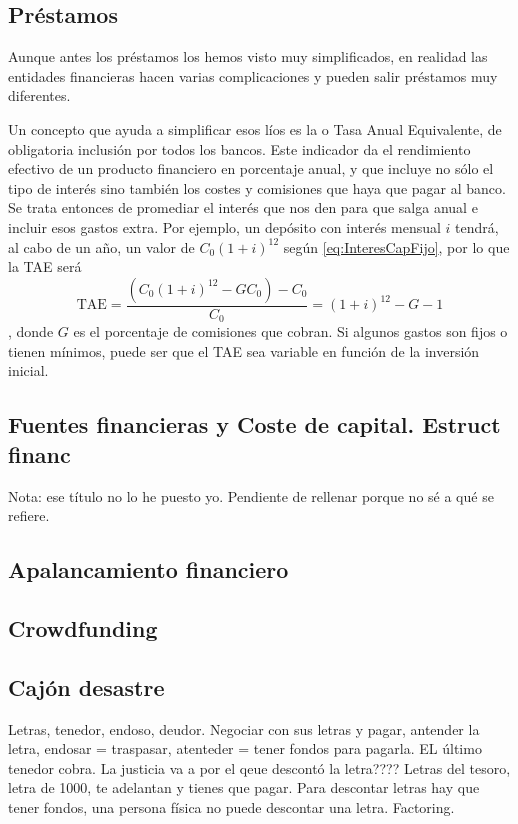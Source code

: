 \documentclass[nochap,palatino,shortheader]{apuntes}
\begin{document}
\subsection{Préstamos}

Aunque antes los préstamos los hemos visto muy simplificados, en realidad las entidades financieras hacen varias complicaciones y pueden salir préstamos muy diferentes.

Un concepto que ayuda a simplificar esos líos es la  o Tasa Anual Equivalente, de obligatoria inclusión por todos los bancos. Este indicador da el rendimiento efectivo de un producto financiero en porcentaje anual, y que incluye no sólo el tipo de interés sino también los costes y comisiones que haya que pagar al banco. Se trata entonces de promediar el interés que nos den para que salga anual e incluir esos gastos extra. Por ejemplo, un depósito con interés mensual $i$ tendrá, al cabo de un año, un valor de $C_0(1+i)^{12}$ según \eqref{eq:InteresCapFijo}, por lo que la TAE será \[ \mathrm{TAE} = \frac{(C_0(1+i)^{12} - GC_0) - C_0}{C_0} = (1+i)^{12} - G - 1 \], donde $G$ es el porcentaje de comisiones que cobran. Si algunos gastos son fijos o tienen mínimos, puede ser que el TAE sea variable en función de la inversión inicial.

\subsection{Fuentes financieras y Coste de capital. Estruct financ}

Nota: ese título no lo he puesto yo. Pendiente de rellenar porque no sé a qué se refiere.

\subsection{Apalancamiento financiero}

\subsection{Crowdfunding}

\subsection{Cajón desastre}

Letras, tenedor, endoso, deudor. Negociar con sus letras y pagar, antender la letra, endosar = traspasar, atenteder = tener fondos para pagarla. EL último tenedor cobra. La justicia va a por el qeue descontó la letra????  Letras del tesoro, letra de 1000, te adelantan y tienes que pagar. Para descontar letras hay que tener fondos, una persona física no puede descontar una letra. Factoring.
\end{document}
